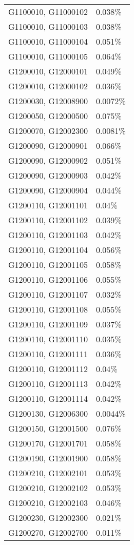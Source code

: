 \begin{longtable}[]{@{}ll@{}}
G1100010, G11000102 & 0.038\% \\
G1100010, G11000103 & 0.038\% \\
G1100010, G11000104 & 0.051\% \\
G1100010, G11000105 & 0.064\% \\
G1200010, G12000101 & 0.049\% \\
G1200010, G12000102 & 0.036\% \\
G1200030, G12008900 & 0.0072\% \\
G1200050, G12000500 & 0.075\% \\
G1200070, G12002300 & 0.0081\% \\
G1200090, G12000901 & 0.066\% \\
G1200090, G12000902 & 0.051\% \\
G1200090, G12000903 & 0.042\% \\
G1200090, G12000904 & 0.044\% \\
G1200110, G12001101 & 0.04\% \\
G1200110, G12001102 & 0.039\% \\
G1200110, G12001103 & 0.042\% \\
G1200110, G12001104 & 0.056\% \\
G1200110, G12001105 & 0.058\% \\
G1200110, G12001106 & 0.055\% \\
G1200110, G12001107 & 0.032\% \\
G1200110, G12001108 & 0.055\% \\
G1200110, G12001109 & 0.037\% \\
G1200110, G12001110 & 0.035\% \\
G1200110, G12001111 & 0.036\% \\
G1200110, G12001112 & 0.04\% \\
G1200110, G12001113 & 0.042\% \\
G1200110, G12001114 & 0.042\% \\
G1200130, G12006300 & 0.0044\% \\
G1200150, G12001500 & 0.076\% \\
G1200170, G12001701 & 0.058\% \\
G1200190, G12001900 & 0.058\% \\
G1200210, G12002101 & 0.053\% \\
G1200210, G12002102 & 0.053\% \\
G1200210, G12002103 & 0.046\% \\
G1200230, G12002300 & 0.021\% \\
G1200270, G12002700 & 0.011\% \\

\end{longtable}
